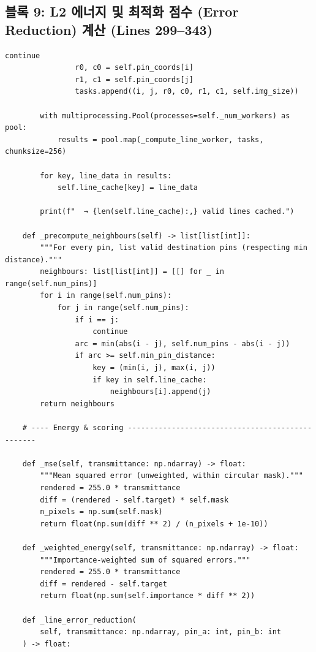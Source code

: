 \subsection*{블록 9: L2 에너지 및 최적화 점수 (Error Reduction) 계산 (Lines 299--343)}
\begin{lstlisting}[firstnumber=299]
                    continue
                r0, c0 = self.pin_coords[i]
                r1, c1 = self.pin_coords[j]
                tasks.append((i, j, r0, c0, r1, c1, self.img_size))

        with multiprocessing.Pool(processes=self._num_workers) as pool:
            results = pool.map(_compute_line_worker, tasks, chunksize=256)

        for key, line_data in results:
            self.line_cache[key] = line_data

        print(f"  → {len(self.line_cache):,} valid lines cached.")

    def _precompute_neighbours(self) -> list[list[int]]:
        """For every pin, list valid destination pins (respecting min distance)."""
        neighbours: list[list[int]] = [[] for _ in range(self.num_pins)]
        for i in range(self.num_pins):
            for j in range(self.num_pins):
                if i == j:
                    continue
                arc = min(abs(i - j), self.num_pins - abs(i - j))
                if arc >= self.min_pin_distance:
                    key = (min(i, j), max(i, j))
                    if key in self.line_cache:
                        neighbours[i].append(j)
        return neighbours

    # ---- Energy & scoring -------------------------------------------------

    def _mse(self, transmittance: np.ndarray) -> float:
        """Mean squared error (unweighted, within circular mask)."""
        rendered = 255.0 * transmittance
        diff = (rendered - self.target) * self.mask
        n_pixels = np.sum(self.mask)
        return float(np.sum(diff ** 2) / (n_pixels + 1e-10))

    def _weighted_energy(self, transmittance: np.ndarray) -> float:
        """Importance-weighted sum of squared errors."""
        rendered = 255.0 * transmittance
        diff = rendered - self.target
        return float(np.sum(self.importance * diff ** 2))

    def _line_error_reduction(
        self, transmittance: np.ndarray, pin_a: int, pin_b: int
    ) -> float:
\end{lstlisting}
